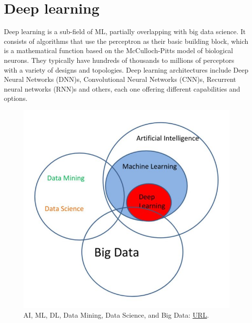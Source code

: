 \section{Deep learning}
Deep learning is a sub-field of ML, partially overlapping with big data science. It consists of algorithms that use the perceptron as their basic building block, which is a mathematical function based on the McCulloch-Pitts model of biological neurons. They typically have hundreds of thousands to millions of perceptors with a variety of designs and topologies. Deep learning architectures include Deep Neural Networks (DNN)s, Convolutional Neural Networks (CNN)s, Recurrent neural networks (RNN)s and others, each one offering different capabilities and options.

\begin{figure}[H]
    \centering
        \includegraphics[scale=0.4]{Images/ai_data_science_diagram.jpg}
        \decoRule
        \caption[AI Venn Diagram]{AI, ML, DL, Data Mining, Data Science, and Big Data: \href{https://whatsthebigdata.com/2016/10/17/visually-linking-ai-machine-learning-deep-learning-big-data-and-data-science/}{URL}.}
        \label{fig:AI Venn Diagram}
\end{figure}

